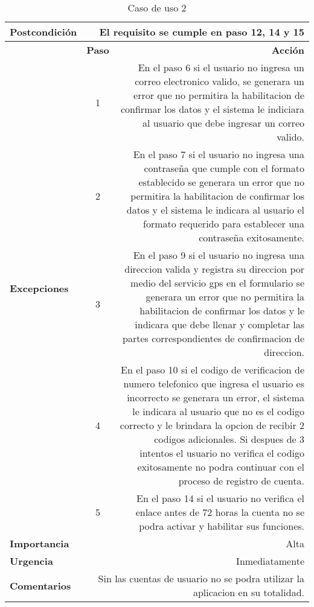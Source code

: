 \documentclass[conference]{IEEEtran}
\begin{document}
\begin{table}[H]
\begin{adjustbox}{width=0.47\textwidth}
\begin{tabular}{|p{11.215em}|r|r|}
    \midrule
    \textbf{Postcondición} & \multicolumn{2}{p{37.43em}|}{El requisito se cumple en paso 12, 14 y 15 } \\
    \midrule
    \multirow{6}[12]{*}{\textbf{Excepciones}} & \textbf{Paso} & \multicolumn{1}{p{32em}|}{\textbf{Acción}} \\
\cmidrule{2-3}    \multicolumn{1}{|c|}{} & \multicolumn{1}{c|}{1} & \multicolumn{1}{p{32em}|}{En el paso 6 si el usuario no ingresa un correo electronico valido, se generara un error que no permitira la habilitacion de confirmar los datos y el sistema le indiciara al usuario que debe ingresar un correo valido.} \\
\cmidrule{2-3}    \multicolumn{1}{|c|}{} & \multicolumn{1}{c|}{2} & \multicolumn{1}{p{32em}|}{En el paso 7 si el usuario no ingresa una contraseña que cumple con el formato establecido se generara un error que no permitira la habilitacion de confirmar los datos y el sistema le indicara al usuario el formato requerido para establecer una contraseña exitosamente.} \\
\cmidrule{2-3}    \multicolumn{1}{|c|}{} & \multicolumn{1}{c|}{3} & \multicolumn{1}{p{32em}|}{En el paso 9 si el usuario no ingresa una direccion valida y registra su direccion por medio del servicio gps en el formulario se generara un error que no permitira la habilitacion de confirmar los datos y le indicara que debe llenar y completar las partes correspondientes de confirmacion de direccion.} \\
\cmidrule{2-3}    \multicolumn{1}{|c|}{} & \multicolumn{1}{c|}{4} & \multicolumn{1}{p{32em}|}{En el paso 10 si el codigo de verificacion de numero telefonico que ingresa el usuario es incorrecto se generara un error, el sistema le indicara al usuario que no es el codigo correcto y le brindara la opcion de recibir 2 codigos adicionales. Si despues de 3 intentos el usuario no verifica el codigo exitosamente no podra continuar con el proceso de registro de cuenta.} \\
\cmidrule{2-3}    \multicolumn{1}{|c|}{} & \multicolumn{1}{c|}{5} & \multicolumn{1}{p{32em}|}{En el paso 14 si el usuario no verifica el enlace antes de 72 horas la cuenta no se podra activar y habilitar sus funciones.} \\
    \midrule
    \textbf{Importancia} & \multicolumn{2}{p{37.43em}|}{Alta} \\
    \midrule
    \textbf{Urgencia} & \multicolumn{2}{p{37.43em}|}{Inmediatamente} \\
    \midrule
    \textbf{Comentarios} & \multicolumn{2}{p{37.43em}|}{Sin las cuentas de usuario no se podra utilizar la aplicacion en su totalidad.} \\
    \bottomrule
    \end{tabular}%
    \end{adjustbox}
    \vspace{0.3cm}
    \caption{Caso de uso 2}
  \label{tab:addlabel}%
\end{table}%
\end{document}
